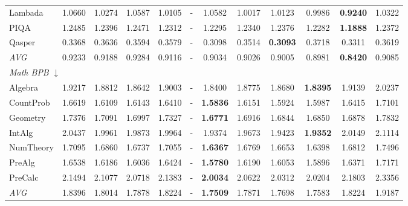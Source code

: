 \begin{table}[htbp]
\begin{tabular}{lccccccccccc}
Lambada & 1.0660 & 1.0274 & 1.0587 & 1.0105 & - & 1.0582 & 1.0017 & 1.0123 & 0.9986 & \textbf{0.9240} & 1.0322 \\
PIQA & 1.2485 & 1.2396 & 1.2471 & 1.2312 & - & 1.2295 & 1.2340 & 1.2376 & 1.2282 & \textbf{1.1888} & 1.2372 \\
Qasper & 0.3368 & 0.3636 & 0.3594 & 0.3579 & - & 0.3098 & 0.3514 & \textbf{0.3093} & 0.3718 & 0.3311 & 0.3619 \\
\textit{AVG} & 0.9233 & 0.9188 & 0.9284 & 0.9116 & - & 0.9034 & 0.9026 & 0.9005 & 0.8981 & \textbf{0.8420} & 0.9085 \\
\midrule
\multicolumn{12}{l}{\textit{Math BPB} $\downarrow$} \\
Algebra & 1.9217 & 1.8812 & 1.8642 & 1.9003 & - & 1.8400 & 1.8775 & 1.8680 & \textbf{1.8395} & 1.9139 & 2.0237 \\
CountProb & 1.6619 & 1.6109 & 1.6143 & 1.6410 & - & \textbf{1.5836} & 1.6151 & 1.5924 & 1.5987 & 1.6415 & 1.7101 \\
Geometry & 1.7376 & 1.7091 & 1.6997 & 1.7327 & - & \textbf{1.6771} & 1.6916 & 1.6844 & 1.6850 & 1.6878 & 1.7832 \\
IntAlg & 2.0437 & 1.9961 & 1.9873 & 1.9964 & - & 1.9374 & 1.9673 & 1.9423 & \textbf{1.9352} & 2.0149 & 2.1114 \\
NumTheory & 1.7095 & 1.6860 & 1.6737 & 1.7055 & - & \textbf{1.6367} & 1.6769 & 1.6653 & 1.6398 & 1.6812 & 1.7496 \\
PreAlg & 1.6538 & 1.6186 & 1.6036 & 1.6424 & - & \textbf{1.5780} & 1.6190 & 1.6053 & 1.5896 & 1.6371 & 1.7171 \\
PreCalc & 2.1494 & 2.1077 & 2.0718 & 2.1383 & - & \textbf{2.0034} & 2.0622 & 2.0312 & 2.0204 & 2.1803 & 2.3356 \\
\textit{AVG} & 1.8396 & 1.8014 & 1.7878 & 1.8224 & - & \textbf{1.7509} & 1.7871 & 1.7698 & 1.7583 & 1.8224 & 1.9187 \\
\bottomrule
\end{tabular}
\end{table}